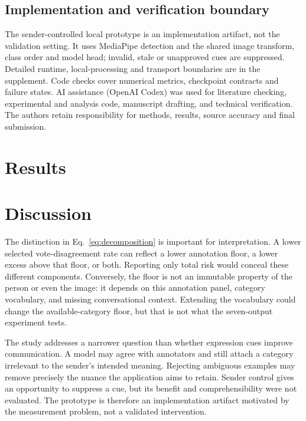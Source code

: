 \documentclass[pdflatex,sn-mathphys-num]{sn-jnl}
\begin{document}
\subsection{Implementation and verification boundary}
The sender-controlled local prototype is an implementation artifact, not the validation setting. It uses MediaPipe detection \cite{lugaresi2019mediapipe} and the shared image transform, class order and model head; invalid, stale or unapproved cues are suppressed. Detailed runtime, local-processing and transport boundaries are in the supplement. Code checks cover numerical metrics, checkpoint contracts and failure states. AI assistance (OpenAI Codex) was used for literature checking, experimental and analysis code, manuscript drafting, and technical verification. The authors retain responsibility for methods, results, source accuracy and final submission.

\section{Results}


\section{Discussion}


The distinction in Eq.~\ref{eq:decomposition} is important for interpretation. A lower selected vote-disagreement rate can reflect a lower annotation floor, a lower excess above that floor, or both. Reporting only total risk would conceal these different components. Conversely, the floor is not an immutable property of the person or even the image: it depends on this annotation panel, category vocabulary, and missing conversational context. Extending the vocabulary could change the available-category floor, but that is not what the seven-output experiment tests.

The study addresses a narrower question than whether expression cues improve communication. A model may agree with annotators and still attach a category irrelevant to the sender's intended meaning. Rejecting ambiguous examples may remove precisely the nuance the application aims to retain. Sender control gives an opportunity to suppress a cue, but its benefit and comprehensibility were not evaluated. The prototype is therefore an implementation artifact motivated by the measurement problem, not a validated intervention.
\end{document}
